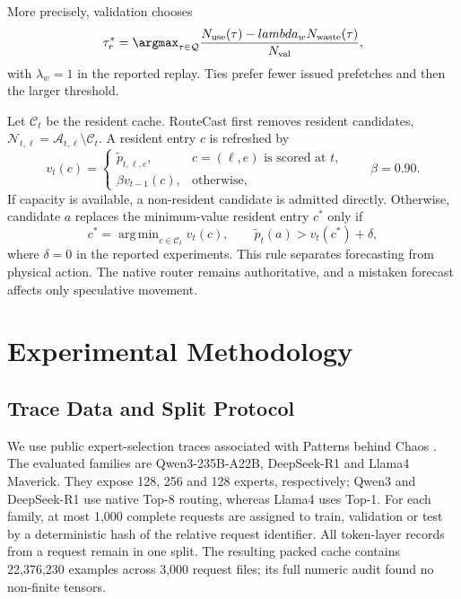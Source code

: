 \documentclass[conference]{IEEEtran}
\DeclareMathOperator*{\argmin}{arg\,min}
\begin{document}
More precisely, validation chooses
\begin{equation}
\tau_r^*=\argmax_{\tau\in\mathcal{Q}}
\frac{N_{\mathrm{use}}(\tau)-lambda_wN_{\mathrm{waste}}(\tau)}
{N_{\mathrm{val}}},
\label{eq:abstention-utility}
\end{equation}
with $\lambda_w=1$ in the reported replay. Ties prefer fewer issued prefetches and then the larger threshold.

Let $\mathcal{C}_{t}$ be the resident cache. RouteCast first removes resident candidates, $\mathcal{N}_{t,\ell}=\mathcal{A}_{t,\ell}\setminus\mathcal{C}_{t}$. A resident entry $c$ is refreshed by
\begin{equation}
v_t(c)=
\begin{cases}
\tilde p_{t,\ell,e}, & c=(\ell,e)\text{ is scored at }t,\\
\beta v_{t-1}(c), & \text{otherwise},
\end{cases}
\qquad \beta=0.90.
\label{eq:cache-value}
\end{equation}
If capacity is available, a non-resident candidate is admitted directly. Otherwise, candidate $a$ replaces the minimum-value resident entry $c^*$ only if
\begin{equation}
c^*=\argmin_{c\in\mathcal{C}_t}v_t(c),
\qquad \tilde p_t(a)>v_t(c^*)+\delta,
\label{eq:cache-admission}
\end{equation}
where $\delta=0$ in the reported experiments. This rule separates forecasting from physical action. The native router remains authoritative, and a mistaken forecast affects only speculative movement.

\section{Experimental Methodology}
\subsection{Trace Data and Split Protocol}
We use public expert-selection traces associated with Patterns behind Chaos \cite{patterns}. The evaluated families are Qwen3-235B-A22B, DeepSeek-R1 and Llama4 Maverick. They expose 128, 256 and 128 experts, respectively; Qwen3 and DeepSeek-R1 use native Top-8 routing, whereas Llama4 uses Top-1. For each family, at most 1,000 complete requests are assigned to train, validation or test by a deterministic hash of the relative request identifier. All token-layer records from a request remain in one split. The resulting packed cache contains 22,376,230 examples across 3,000 request files; its full numeric audit found no non-finite tensors.
\end{document}
